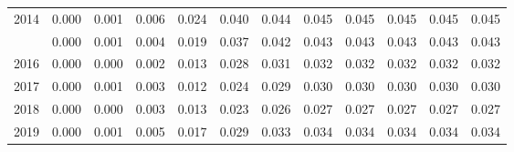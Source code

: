 \documentclass[
]{article}
\begin{document}
\begin{longtable}[t]{lrrrrrrrrrrr}
2014 & 0.000 & 0.001 & 0.006 & 0.024 & 0.040 & 0.044 & 0.045 & 0.045 & 0.045 & 0.045 & 0.045\\
\addlinespace
2015 & 0.000 & 0.001 & 0.004 & 0.019 & 0.037 & 0.042 & 0.043 & 0.043 & 0.043 & 0.043 & 0.043\\
2016 & 0.000 & 0.000 & 0.002 & 0.013 & 0.028 & 0.031 & 0.032 & 0.032 & 0.032 & 0.032 & 0.032\\
2017 & 0.000 & 0.001 & 0.003 & 0.012 & 0.024 & 0.029 & 0.030 & 0.030 & 0.030 & 0.030 & 0.030\\
2018 & 0.000 & 0.000 & 0.003 & 0.013 & 0.023 & 0.026 & 0.027 & 0.027 & 0.027 & 0.027 & 0.027\\
2019 & 0.000 & 0.001 & 0.005 & 0.017 & 0.029 & 0.033 & 0.034 & 0.034 & 0.034 & 0.034 & 0.034\\*
\end{longtable}
\end{document}
